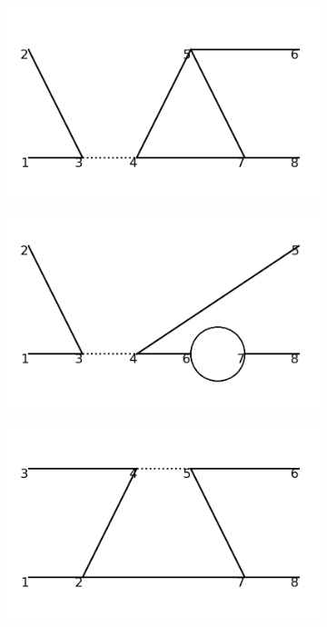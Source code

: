 \documentclass[11pt,a4paper,twoside,pdf]{article}
\numberwithin{equation}{section}
\begin{document}
\begin{figure}[h!]
\begin{subfigure}[t]{0.16\textwidth}
    \end{subfigure}
    \hfill
    \begin{subfigure}[t]{0.16\textwidth}
        \centering
        \includegraphics[width=\textwidth]{plots/order4_2to2/31.png}
    \end{subfigure}
    \hfill
    \begin{subfigure}[t]{0.16\textwidth}
        \centering
        \includegraphics[width=\textwidth]{plots/order4_2to2/32.png}
    \end{subfigure}
    \hfill
    \begin{subfigure}[t]{0.16\textwidth}
        \centering
        \includegraphics[width=\textwidth]{plots/order4_2to2/33.png}

\end{subfigure}
\end{figure}
\end{document}
